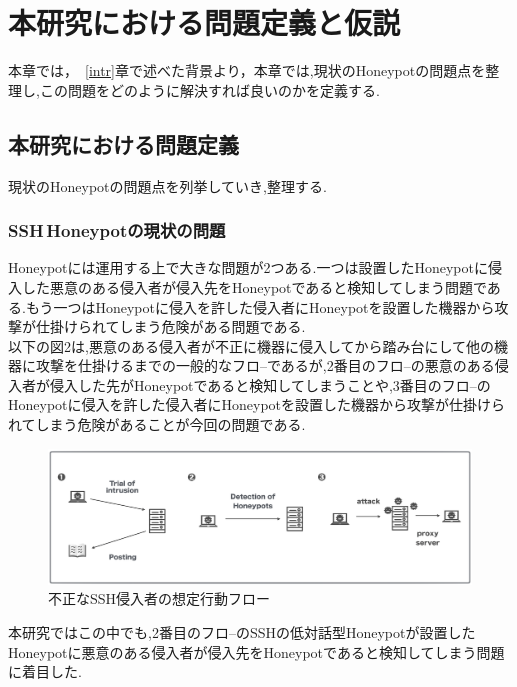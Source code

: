 \chapter{本研究における問題定義と仮説}
\label{appr}

本章では，~\ref{intr}章で述べた背景より，本章では,現状のHoneypotの問題点を整理し,この問題をどのように解決すれば良いのかを定義する.

\section{本研究における問題定義}
\label{appr:problem}
現状のHoneypotの問題点を列挙していき,整理する.

\subsection{SSH\,Honeypotの現状の問題}
\label{appr:problemofSshHoneypot}
Honeypotには運用する上で大きな問題が2つある.一つは設置したHoneypotに侵入した悪意のある侵入者が侵入先をHoneypotであると検知してしまう問題である.もう一つはHoneypotに侵入を許した侵入者にHoneypotを設置した機器から攻撃が仕掛けられてしまう危険がある問題である.\\
以下の図2は,悪意のある侵入者が不正に機器に侵入してから踏み台にして他の機器に攻撃を仕掛けるまでの一般的なフロ--であるが,2番目のフロ--の悪意のある侵入者が侵入した先がHoneypotであると検知してしまうことや,3番目のフロ--のHoneypotに侵入を許した侵入者にHoneypotを設置した機器から攻撃が仕掛けられてしまう危険があることが今回の問題である.

\vspace{10mm}
\begin{figure}[H]
    \centering
    \includegraphics[width=1.0\textwidth]{figures/nagare.png}
    \caption{不正なSSH侵入者の想定行動フロー}
    \label{fig:evo}
\end{figure}

本研究ではこの中でも,2番目のフロ--のSSHの低対話型Honeypotが設置したHoneypotに悪意のある侵入者が侵入先をHoneypotであると検知してしまう問題に着目した.

